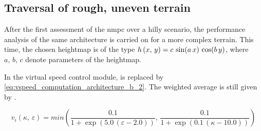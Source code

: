 \subsection{Traversal of rough, uneven terrain}
\label{subsection:traversalRoughTerrain}

After the first assessment of the \acrshort{nmpc} over a hilly scenario, the performance analysis of the same architecture is carried on for a more complex terrain. This time, the chosen heightmap is of the type $h\left(x,\,y\right) = c \, \sin(a\,x) \, \cos(b\,y)$, where $a,\,b,\,c$ denote parameters of the heightmap.

In the virtual speed control module,  is replaced by \eqref{eq:vspeed_computation_architecture_b_2}. The weighted average is still given by .

\begin{equation}
v_i\left(\kappa,\,\varepsilon\right) = min\left( \frac{0.1}{ 1 + \exp\left( 5.0\,( \varepsilon - 2.0 ) \right) },\, \frac{0.1}{ 1 + \exp\left( 0.1\,( \kappa - 10.0 ) \right) } \right)
\label{eq:vspeed_computation_architecture_b_2}
\end{equation}

